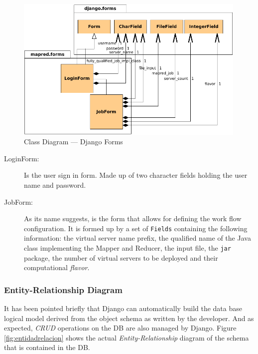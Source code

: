 \begin{figure}[tbp]
\begin{center}
\includegraphics[width=0.99\textwidth]{imagenes/031.pdf}
 \caption{Class Diagram --- Django Forms}
\label{fig:clasesformulariosdjango}
\end{center}
\end{figure}

\begin{description}
 \item[LoginForm:] Is the user sign in form. Made up of two character fields holding the user name and password.
 \item[JobForm:] As its name suggests, is the form that allows for defining the work flow configuration. It is formed up by a set of \texttt{Fields} containing the following information: the virtual server name prefix, the qualified name of the Java class implementing the Mapper and Reducer, the input file, the \texttt{jar} package, the number of virtual servers to be deployed and their computational \emph{flavor}.
\end{description}


\subsubsection{Entity-Relationship Diagram}\label{subsubsec:entidadrelacion}
\noindent It has been pointed briefly that Django can automatically build the data base logical model derived from the object schema as written by the developer. And as expected, \emph{CRUD} operations on the DB are also managed by Django. Figure \ref{fig:entidadrelacion} shows the actual \emph{Entity-Relationship} diagram of the schema that is contained in the DB.

